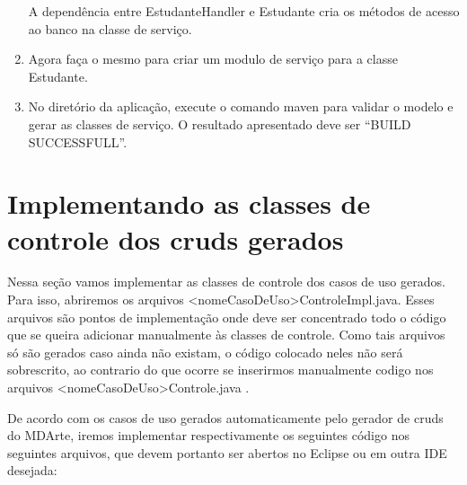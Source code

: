 \begin{enumerate}
A dependência entre EstudanteHandler e Estudante cria os métodos de acesso ao
banco na classe de serviço.

\item Agora faça o mesmo para criar um modulo de serviço para a classe
Estudante.
	
\item No diretório da aplicação, execute o comando maven para validar o modelo
e gerar as classes de serviço. O resultado apresentado deve ser “BUILD
SUCCESSFULL”.
\end{enumerate}

\section{Implementando as classes de controle dos cruds gerados}
Nessa seção vamos implementar as classes de controle dos casos de uso gerados.
Para isso, abriremos os arquivos <nomeCasoDeUso>ControleImpl.java. Esses
arquivos são pontos de implementação onde deve ser concentrado todo o código que
se queira adicionar manualmente às classes de controle. Como tais arquivos só
são gerados caso ainda não existam, o código colocado neles não será
sobrescrito, ao contrario do que ocorre se inserirmos manualmente codigo nos
arquivos <nomeCasoDeUso>Controle.java .

De acordo com os casos de uso gerados automaticamente pelo gerador de cruds do
MDArte, iremos implementar respectivamente os seguintes código nos seguintes
arquivos, que devem portanto ser abertos no Eclipse ou em outra IDE desejada:

